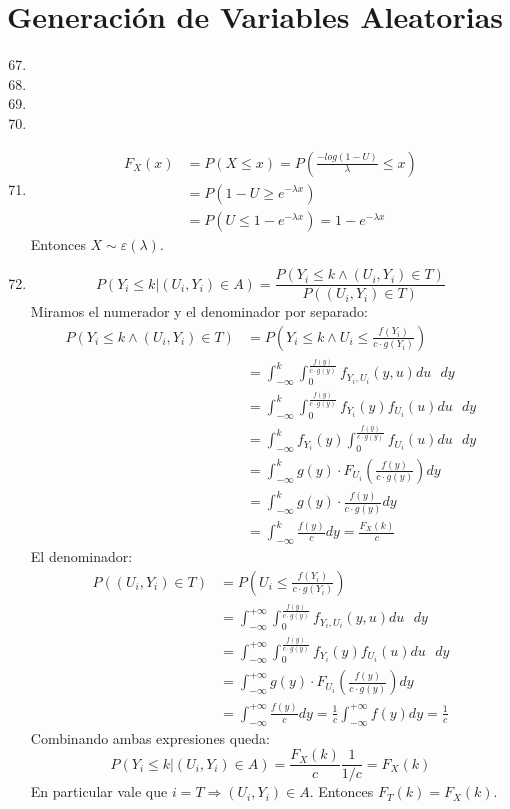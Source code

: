 \section{Generación de Variables Aleatorias}
\begin{enumerate}
	\setcounter{enumi}{66}
	\item
	\item
	\item
	\item
	\item
		\begin{align*}
			F_X(x)	& = P(X\leq x) = P\left(\frac{-log(1-U)}{\lambda} \leq x\right)	\\
					& = P\left(1-U \geq e^{-\lambda x}\right)	\\
					& = P(U \leq 1 - e^{-\lambda x}) = 1 - e^{-\lambda x}
		\end{align*}
		Entonces $X\sim \varepsilon(\lambda)$.
	\item
		$$P(Y_i \leq k | (U_i, Y_i) \in A) = \frac{P(Y_i \leq k \land (U_i, Y_i) \in T)}{P( (U_i, Y_i) \in T)}$$
		Miramos el numerador y el denominador por separado:
		\begin{align*}
			P(Y_i \leq k \land (U_i, Y_i) \in T)	& = P\left(Y_i \leq k \land U_i \leq \frac{f(Y_i)}{c\cdot g(Y_i)}\right)		\\
									& = \int_{-\infty}^{k}\int_{0}^{\frac{f(y)}{c\cdot g(y)}} f_{Y_i,U_i}(y,u) du\text{ }dy			\\
									& = \int_{-\infty}^{k}\int_{0}^{\frac{f(y)}{c\cdot g(y)}} f_{Y_i}(y)f_{U_i}(u) du\text{ }dy		\\
									& = \int_{-\infty}^{k} f_{Y_i}(y) \int_{0}^{\frac{f(y)}{c\cdot g(y)}} f_{U_i}(u) du\text{ }dy	\\
									& = \int_{-\infty}^{k} g(y)\cdot F_{U_i}\left(\frac{f(y)}{c\cdot g(y)}\right) dy				\\
									& = \int_{-\infty}^{k} g(y)\cdot \frac{f(y)}{c\cdot g(y)} dy									\\
									& = \int_{-\infty}^{k} \frac{f(y)}{c} dy = \frac{F_X(k)}{c}
		\end{align*}
		El denominador:
		\begin{align*}
			P((U_i, Y_i) \in T)	& = P\left(U_i \leq \frac{f(Y_i)}{c\cdot g(Y_i)}\right)	\\
								& = \int_{-\infty}^{+\infty}\int_{0}^{\frac{f(y)}{c\cdot g(y)}} f_{Y_i,U_i}(y,u) du\text{ }dy		\\
								& = \int_{-\infty}^{+\infty}\int_{0}^{\frac{f(y)}{c\cdot g(y)}} f_{Y_i}(y)f_{U_i}(u) du\text{ }dy	\\
								& = \int_{-\infty}^{+\infty}g(y)\cdot F_{U_i}\left(\frac{f(y)}{c\cdot g(y)}\right) dy				\\
								& = \int_{-\infty}^{+\infty}\frac{f(y)}{c} dy = \frac{1}{c} \int_{-\infty}^{+\infty}f(y) dy	= \frac{1}{c}
		\end{align*}
		Combinando ambas expresiones queda:
		$$P(Y_i \leq k | (U_i, Y_i) \in A) = \frac{F_X(k)}{c} \frac{1}{1/c} = F_X(k)$$
		En particular vale que $i=T \Rightarrow (U_i, Y_i) \in A$.
		Entonces $F_T(k) = F_X(k)$.
\end{enumerate}
